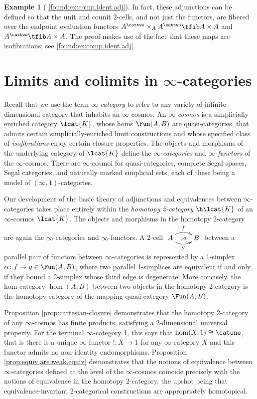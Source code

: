 \documentclass[12pt,reqno]{amsart}
\theoremstyle{plain}
\theoremstyle{definition}
\newtheorem{ex}[thm]{Example}
\theoremstyle{remark}
\numberwithin{equation}{subsection}
\newcommand{\extRef}[3]{%
  {\protect\IfBeginWith{#3}{itm:}{}{#2.}}\ref*{#1:#3}}
\newcommand{\refI}{\extRef{found}{I}}
\begin{document}
\begin{ex}[{\refI{ex:comp.ident.adj}}]
In fact, these adjunctions can be defined so that the unit and counit 2-cells, and not just the functors, are fibered over the endpoint evaluation functors $A^\cattwo\times_AA^\cattwo \tfib A \times A$ and $A^\cattwo \tfib A \times A$. The proof makes use of the fact that these maps are isofibrations; see \refI{ex:comp.ident.adj}.
\end{ex}





\renewcommand\thesection{Lecture~\arabic{section}}
\section{Limits and colimits in \texorpdfstring{$\infty$}{infinity}-categories}\label{sec:limits}
\renewcommand\thesection{\arabic{section}}


Recall that we use the term $\infty$-\emph{category} to refer to any variety of infinite-dimensional category that inhabits an $\infty$-cosmos.  An $\infty$-\emph{cosmos} is a simplicially enriched category $\lcat{K}$, whose homs $\Fun(A,B)$ are quasi-categories, that admits certain simplicially-enriched limit constructions and whose specified class of \emph{isofibrations} enjoy certain closure properties. The objects and morphisms of the underlying category of $\lcat{K}$ define the $\infty$-\emph{categories} and $\infty$-\emph{functors} of the $\infty$-cosmos. There are $\infty$-cosmoi for quasi-categories, complete Segal spaces, Segal categories, and naturally marked simplicial sets, each of these being a model of $(\infty,1)$-categories.

Our development of the basic theory of adjunctions and equivalences between $\infty$-cat\-e\-gor\-ies takes place entirely within the \emph{homotopy 2-category} $\h\lcat{K}$ of an $\infty$-cosmos $\lcat{K}$. The objects and morphisms in the homotopy 2-category are again the $\infty$-categories and $\infty$-functors. A 2-cell $\xymatrix{ A \ar@/^2ex/[r]^f \ar@/_2ex/[r]_{g} \ar@{}[r]|{\Downarrow \alpha} &B}$ between a parallel pair of functors between $\infty$-categories is represented by a 1-simplex $\alpha \colon f \to g \in \Fun(A,B)$, where two parallel 1-simplices are equivalent if and only if they bound a 2-simplex whose third edge is degenerate. More concisely, the hom-category $\hom(A,B)$ between two objects in the homotopy 2-category is the homotopy category of the mapping quasi-category $\Fun(A,B)$.

Proposition \ref{prop:cartesian-closure} demonstrates that the homotopy 2-category of any $\infty$-cosmos has finite products, satisfying a 2-dimensional universal property. For the terminal $\infty$-category 1, this says that $\hom(X,1) \cong \catone$, that is there is a unique $\infty$-functor $! \colon X \to 1$ for any $\infty$-category $X$ and this functor admits no non-identity endomorphisms.  Proposition \ref{prop:equiv.are.weak.equiv} demonstrates that the notions of equivalence between $\infty$-categories defined at the level of the $\infty$-cosmos coincide precisely with the notions of equivalence in the homotopy 2-category, the upshot being that equivalence-invariant 2-categorical constructions are appropriately homotopical.
\end{document}
